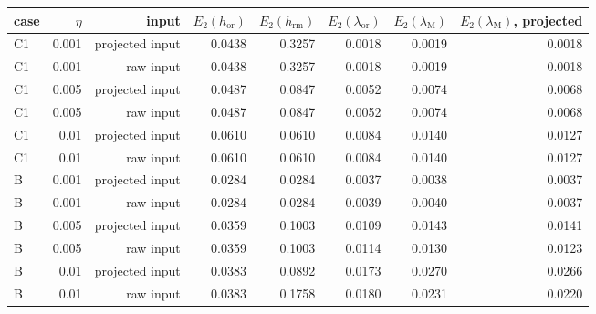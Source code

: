 \begin{tabular}{lrrrrrrr}
\toprule
case & $\eta$ & input & $E_2(h_{\mathrm{or}})$ & $E_2(h_{\mathrm{rm}})$ & $E_2(\lambda_{\mathrm{or}})$ & $E_2(\lambda_{\mathrm{M}})$ & $E_2(\lambda_{\mathrm{M}})$, projected \\
\midrule
C1 & 0.001 & projected input & 0.0438 & 0.3257 & 0.0018 & 0.0019 & 0.0018 \\
C1 & 0.001 & raw input & 0.0438 & 0.3257 & 0.0018 & 0.0019 & 0.0018 \\
C1 & 0.005 & projected input & 0.0487 & 0.0847 & 0.0052 & 0.0074 & 0.0068 \\
C1 & 0.005 & raw input & 0.0487 & 0.0847 & 0.0052 & 0.0074 & 0.0068 \\
C1 & 0.01 & projected input & 0.0610 & 0.0610 & 0.0084 & 0.0140 & 0.0127 \\
C1 & 0.01 & raw input & 0.0610 & 0.0610 & 0.0084 & 0.0140 & 0.0127 \\
B & 0.001 & projected input & 0.0284 & 0.0284 & 0.0037 & 0.0038 & 0.0037 \\
B & 0.001 & raw input & 0.0284 & 0.0284 & 0.0039 & 0.0040 & 0.0037 \\
B & 0.005 & projected input & 0.0359 & 0.1003 & 0.0109 & 0.0143 & 0.0141 \\
B & 0.005 & raw input & 0.0359 & 0.1003 & 0.0114 & 0.0130 & 0.0123 \\
B & 0.01 & projected input & 0.0383 & 0.0892 & 0.0173 & 0.0270 & 0.0266 \\
B & 0.01 & raw input & 0.0383 & 0.1758 & 0.0180 & 0.0231 & 0.0220 \\
\bottomrule
\end{tabular}
